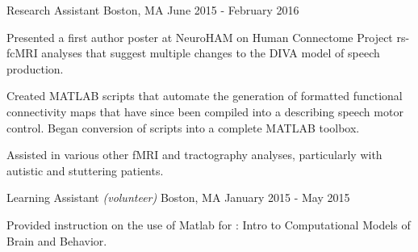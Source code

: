 \begin{cventries}
    {Research Assistant}
    {Boston, MA}
    {June 2015 - February 2016}
    {\begin{cvitems}
        \item{Presented a first author 
            {poster} at NeuroHAM on Human Connectome Project rs-fcMRI analyses that
            suggest multiple changes to the DIVA model of speech 
            production.\vspace*{0.1cm}}
        \item{Created MATLAB scripts that automate the generation of formatted
            functional 
            {connectivity maps} that have since been compiled into a  describing speech motor control. Began
            conversion of scripts into a complete 
            {MATLAB toolbox}.\vspace*{0.1cm}}
        \item{Assisted in various other fMRI and tractography analyses, particularly
            with autistic and stuttering patients.}
    \end{cvitems}}
    \vspace*{0.2cm}
    
    {Learning Assistant \textnormal{\small{\textit{(volunteer)}}}}
    {Boston, MA}
    {January 2015 - May 2015}
    {\begin{cvitems}
        \item{Provided instruction on the use of Matlab for : Intro to Computational Models of
            Brain and Behavior.}
    \end{cvitems}}
    \vspace*{0.2cm}
    

\end{cventries}
